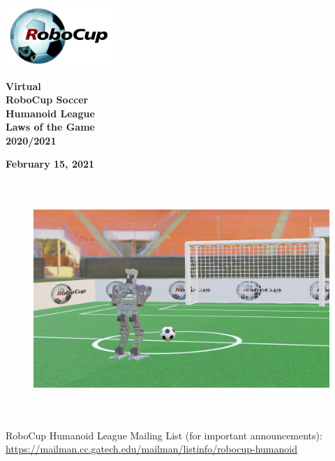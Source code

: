 \documentclass[a4paper]{article}
\title{}
\author{\rulesauthor}
\date{2019-12-11}
\begin{document}
\sffamily

\begin{center}
\includegraphics[width=1.6264in,height=0.9055in]{img/robocup_logo.jpg}

{\Huge \bfseries
Virtual
\\
RoboCup Soccer
\\
Humanoid League
\\
Laws of the Game
\\ \vspace{0.5cm}
2020/2021}

\bigskip

{\bfseries February 15, 2021}
\end{center}

\begin{figure}[!h]
\centering
\includegraphics[height=3.5in]{img/title_virtual.png}
\captionsetup{labelformat=empty}
\end{figure}


\bigskip
RoboCup Humanoid League Mailing List (for important announcements):\\
\url{https://mailman.cc.gatech.edu/mailman/listinfo/robocup-humanoid}
\end{document}
